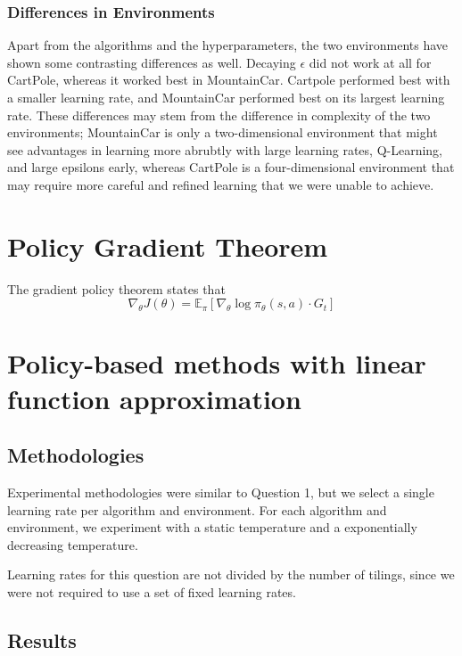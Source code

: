 \documentclass{article}
\begin{document}
\subsubsection{Differences in Environments}
Apart from the algorithms and the hyperparameters, the two environments have shown some
contrasting differences as well. Decaying $\epsilon$ did not work at all for CartPole, whereas
it worked best in MountainCar. Cartpole performed best with a smaller learning rate, and
MountainCar performed best on its largest learning rate. These differences may stem from the
difference in complexity of the two environments; MountainCar is only a two-dimensional environment
that might see advantages in learning more abrubtly with large learning rates, Q-Learning, and large epsilons early, whereas CartPole is a four-dimensional environment
that may require more careful and refined learning that we were unable to achieve.

\section{Policy Gradient Theorem}

The gradient policy theorem states that
\[
  \nabla_\theta J(\theta) = \mathbb{E}_{\pi} \left[ \nabla_{\theta} \log \pi_{\theta}(s, a) \cdot G_t \right]
\]









\section{Policy-based methods with linear function approximation}

\subsection{Methodologies}

Experimental methodologies were similar to Question 1, but we select a single learning rate per
algorithm and environment. For each algorithm and environment, we experiment with a static temperature and a
exponentially decreasing temperature.

Learning rates for this question are not divided by the number of tilings, since we were not
required to use a set of fixed learning rates.

\subsection{Results}
\end{document}
